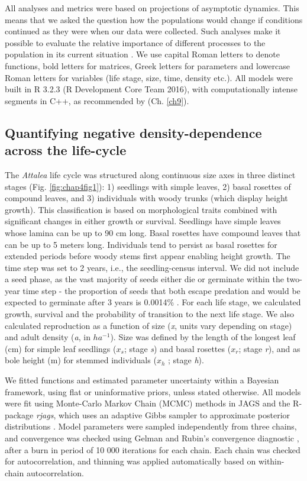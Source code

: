 \documentclass[b5paper,justified]{tufte-book} %
\begin{document}
\begin{fullwidth}
All analyses and metrics were based on projections of asymptotic dynamics. This means that we asked the question how the populations would change if conditions continued as they were when our data were collected. Such analyses make it possible to evaluate the relative importance of different processes to the population in its current situation \citep[see e.g.][]{Caswell2000, Caswell2001}. We use capital Roman letters to denote functions, bold letters for matrices, Greek letters for parameters and lowercase Roman letters for variables (life stage, size, time, density etc.). All models were built in R 3.2.3 (R Development Core Team 2016), with computationally intense segments in C++, as recommended by \citet{Visser2015} (Ch. \ref{ch9}).

\subsection{Quantifying negative density-dependence across the life-cycle}
The \textit{Attalea} life cycle was structured along continuous size axes in three distinct stages (Fig. \ref{fig:chap4fig1}): 1) seedlings with simple leaves, 2) basal rosettes of compound leaves, and 3) individuals with woody trunks (which display height growth). This classification is based on morphological traits combined with significant changes in either growth or survival.  Seedlings have simple leaves whose lamina can be up to 90 cm long. Basal rosettes have compound leaves that can be up to 5 meters long. Individuals tend to persist as basal rosettes for extended periods before woody stems first appear enabling height growth. The time step was set to 2 years, i.e., the seedling-census interval.  We did not include a seed phase, as the vast majority of seeds either die or germinate within the two-year time step - the proportion of seeds that both escape predation and would be expected to germinate after 3 years is 0.0014\% \citep{Harms1995,Visser2011}.  For each life stage, we calculated growth, survival and the probability of transition to the next life stage. We also calculated reproduction as a function of size (\emph{x}, units vary depending on stage) and adult density (\emph{a}, in $ha^{-1}$).  Size was defined by the length of the longest leaf (cm) for simple leaf seedlings ($x_s$; stage \emph{s}) and basal rosettes ($x_r$; stage \emph{r}), and as bole height (m) for stemmed individuals ($x_h$ ; stage \emph{h}).
 
We fitted functions and estimated parameter uncertainty within a Bayesian framework, using flat or uninformative priors, unless stated otherwise. All models were fit using Monte-Carlo Markov Chain (MCMC) methods in JAGS and the R-package \emph{rjags}, which uses an adaptive Gibbs sampler to approximate posterior distributions \citep{Plummer2016}.  Model parameters were sampled independently from three chains, and convergence was checked using Gelman and Rubin's convergence diagnostic \citep{Brooks1998}, after a burn in period of 10 000 iterations for each chain. Each chain was checked for autocorrelation, and thinning was applied automatically based on within-chain autocorrelation. 


\end{fullwidth}
\end{document}
